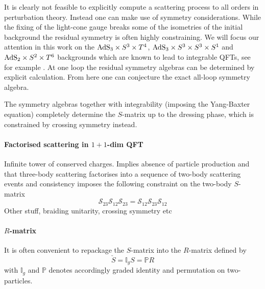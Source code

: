 \documentclass[12pt,a4paper]{article}
\numberwithin{equation}{section}
\newcommand{\lS}{\mathcal{S}}
\newcommand{\comP}[1]{{\bf\textcolor{magenta} {P:} \textcolor{magenta}{#1}}}
\begin{document}
It is clearly not feasible to explicitly compute a scattering process to all orders in perturbation theory. Instead one can make use of symmetry considerations. While the fixing of the light-cone gauge breaks some of the isometries of the initial background the residual symmetry is often highly constraining. We will focus our attention in this work on the ${\rm AdS}_3 \times S^3\times T^4$, ${\rm AdS}_3 \times S^3\times S^3 \times S^1$ and ${\rm AdS}_2 \times S^2\times T^6$ backgrounds which are known to lead to integrable QFTs, see for example \cite{AdS2_2011,Borsato:2014hja,Hoare:2014kma,Borsato:2015mma}. At one loop the residual symmetry algebras can be determined by explicit calculation. From here one can conjecture the exact all-loop symmetry algebra. 
\iffalse
For the backgrounds considered in this paper the relevant part of the off-shell symmetry algebras are
%
\begin{align}
&{\rm AdS}_3 \times S^3\times S^3 \times S^1: && \mathfrak{psu}(1|1)_{\rm ce}^2,\nonumber \\
&{\rm AdS}_3 \times S^3 \times T^4: && \mathfrak{su}(1|1)_{\rm ce}^2, \\
&{\rm AdS}_2 \times S^2\times T^6: && \mathfrak{psu}(1|1)_{\rm ce}\,. \nonumber
\end{align}
\comP{I think the above algebras are correct but it would be good if someone could confirm}
\fi
The symmetry algebras together with integrability (imposing the Yang-Baxter equation) completely determine the $S$-matrix up to the dressing phase, which is constrained by crossing symmetry instead. 

\iffalse


\paragraph{Factorised scattering in $1+1$-dim QFT}

Infinite tower of conserved charges. Implies absence of particle production and that three-body scattering factorises into a sequence of two-body scattering \cite{ZAMOLODCHIKOV1979253} events and consistency imposes the following constraint on the two-body $S$-matrix 
\begin{equation}
\lS_{23}\lS_{12}\lS_{23}=\lS_{12}\lS_{23}\lS_{12}
\end{equation}
Other stuff, braiding unitarity, crossing symmetry etc

\paragraph{$R$-matrix}
It is often convenient to repackage the $S$-matrix into the $R$-matrix defined by 
\begin{equation}\label{key}
	\check{S} = \mathbb{I}_{g} S = \mathbb{P} R
\end{equation}
with $ \mathbb{I}_{g} $ and $ \mathbb{P} $ denotes accordingly graded identity and permutation on two-particles.
\end{document}
